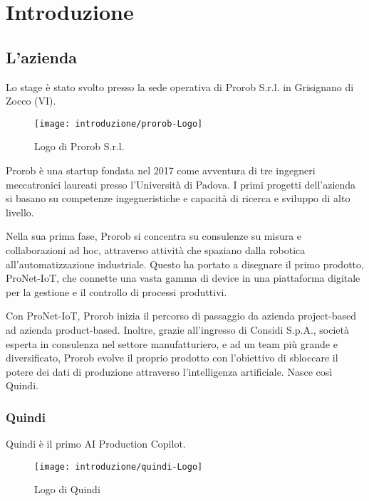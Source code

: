\chapter{Introduzione}
\label{cap:introduzione}


\section{L'azienda}

Lo stage è stato svolto presso la sede operativa di Prorob S.r.l. in Grisignano di Zocco (VI).

\begin{figure}[!ht] 
    \centering 
    \texttt{[image: introduzione/prorob-Logo]} 
    \caption{Logo di Prorob S.r.l.}
\end{figure}

Prorob è una startup fondata nel 2017 come avventura di tre ingegneri meccatronici laureati presso l'Università di Padova.
I primi progetti dell'azienda si basano su competenze ingegneristiche e capacità di ricerca e sviluppo di alto livello.

Nella sua prima fase, Prorob si concentra su consulenze su misura e collaborazioni ad hoc, attraverso attività che spaziano dalla robotica all'automatizzazione industriale.
Questo ha portato a disegnare il primo prodotto, ProNet-IoT, che connette una vasta gamma di device in una piattaforma digitale per la gestione e il controllo di processi produttivi.

Con ProNet-IoT, Prorob inizia il percorso di passaggio da azienda project-based ad azienda product-based.
Inoltre, grazie all'ingresso di Considi S.p.A., società esperta in consulenza nel settore manufatturiero, e ad un team più grande e diversificato, Prorob evolve il proprio prodotto con l'obiettivo di sbloccare il potere dei dati di produzione attraverso l'intelligenza artificiale. Nasce così Quindi.

\bigskip
\vfill
\hfill

\subsection{Quindi}
Quindi è il primo AI Production Copilot.

\bigskip

\begin{figure}[!ht] 
    \centering 
    \texttt{[image: introduzione/quindi-Logo]} 
    \caption{Logo di Quindi}
\end{figure}

